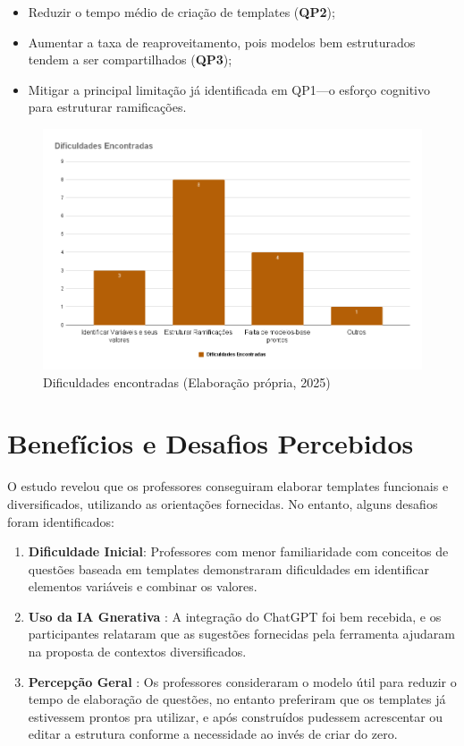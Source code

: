 \begin{itemize}
    \item Reduzir o tempo médio de criação de templates (\textbf{QP2});
    \item Aumentar a taxa de reaproveitamento, pois modelos bem estruturados tendem a ser compartilhados (\textbf{QP3});
    \item Mitigar a principal limitação já identificada em QP1—o esforço cognitivo para estruturar ramificações.
\end{itemize}

\begin{figure}[ht]
	\centering
	\includegraphics[width=16cm]{./imagens/capitulo8/dificuldades-encontradas}
	\caption{Dificuldades encontradas  (Elaboração própria, 2025) }
	\label{fig:dificuldades-encontradas}
\end{figure}

	

\section{Benefícios e Desafios Percebidos}


O estudo revelou que os professores conseguiram elaborar templates funcionais e diversificados, utilizando as orientações fornecidas. No entanto, alguns desafios foram identificados:

\begin{enumerate}
    \item \textbf{Dificuldade Inicial}: Professores com menor familiaridade com conceitos de questões baseada em templates demonstraram dificuldades em identificar elementos variáveis e combinar os valores.
    \item \textbf{Uso da IA Gnerativa} : A integração do ChatGPT foi bem recebida, e os participantes relataram que as sugestões fornecidas pela ferramenta ajudaram na proposta de contextos diversificados.
    \item \textbf{Percepção Geral} : Os professores consideraram o modelo útil para reduzir o tempo de elaboração de questões, no entanto preferiram que os templates já estivessem prontos pra utilizar, e após construídos pudessem acrescentar ou editar a estrutura conforme a necessidade ao invés de criar do zero.
\end{enumerate}


